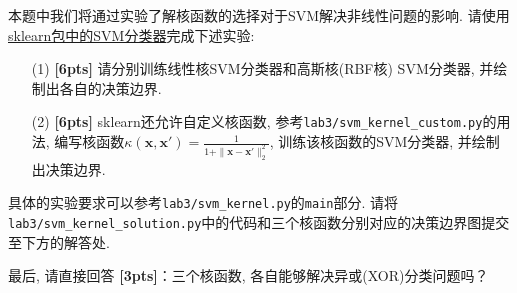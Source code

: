 \documentclass[a4paper,UTF8]{article}
\numberwithin{equation}{section}
\theoremstyle{definition}
\newcommand{\vct}[1]{\boldsymbol{#1}} %
\newcommand{\vx}{\vct{x}}
\begin{document}
本题中我们将通过实验了解核函数的选择对于SVM解决非线性问题的影响. 请使用\href{https://scikit-learn.org/stable/modules/generated/sklearn.svm.SVC.html}{ sklearn包中的SVM分类器}完成下述实验: 
\begin{enumerate}
    \item[(1)] \textbf{[6pts]} 请分别训练线性核SVM分类器和高斯核(RBF核) SVM分类器, 并绘制出各自的决策边界.
    \item[(2)] \textbf{[6pts]} sklearn还允许自定义核函数, 参考\texttt{lab3/svm\_kernel\_custom.py}的用法, 编写核函数$\kappa(\vx, \vx') = \frac{1}{1+\|\vx-\vx'\|_2^{2}}$, 训练该核函数的SVM分类器, 并绘制出决策边界. 
\end{enumerate} 
具体的实验要求可以参考\texttt{lab3/svm\_kernel.py}的\texttt{main}部分. 请将\texttt{lab3/svm\_kernel\_solution.py}中的代码和三个核函数分别对应的决策边界图提交至下方的解答处. 
\vspace{5pt}

最后, 请直接回答 \textbf{[3pts]}：三个核函数, 各自能够解决异或(XOR)分类问题吗？
\end{document}
